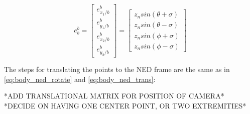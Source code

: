 \documentclass{article}
\begin{document}
\begin{equation}
	e_b^b = 
	\begin{bmatrix}
		e^b_{x_1/b} \\ e^b_{y_1/b} \\ e^b_{x_2/b} \\ e^b_{y_2/b}
	\end{bmatrix}
	=
	\begin{bmatrix}
		z_n sin(\theta + \sigma) \\
		z_n sin(\theta - \sigma) \\
		z_n sin(\phi + \sigma) \\
		z_n sin(\phi - \sigma)
	\end{bmatrix}
\end{equation}

The steps for translating the points to the NED frame are the same as in \eqref{eq:body_ned_rotate} and \eqref{eq:body_ned_trans}:

	

*ADD TRANSLATIONAL MATRIX FOR POSITION OF CAMERA* \\
*DECIDE ON HAVING ONE CENTER POINT, OR TWO EXTREMITIES*
\end{document}
